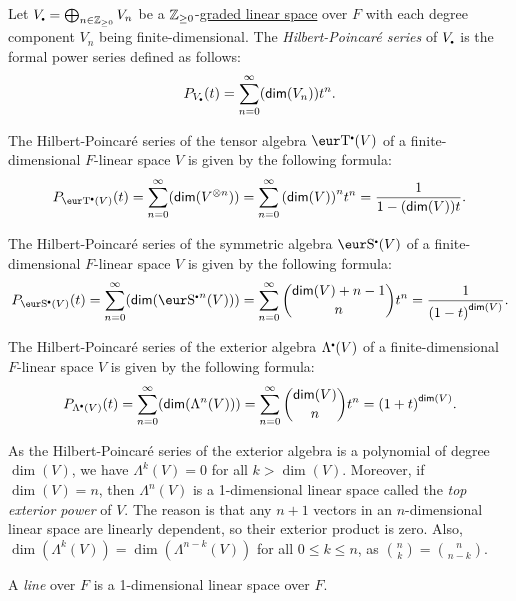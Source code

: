 \begin{definition}\label{def:hilbert_poincare_series}
	Let $V_{\smallbullet} = \bigoplus_{n \in \Z_{\geq 0}} V_n$ be a $\operatorname{\mathbb{Z}}_{\geq 0}$-\hyperref[def:graded_linear_space]{graded linear space} over $F$ with each degree component $V_n$ being finite-dimensional. The \emph{Hilbert-Poincaré series} of $V_{\smallbullet}$ is the formal power series defined as follows:
	\[
		P_{V_{\smallbullet}}(t) = \sum_{n = 0}^{\infty} (\dim(V_n)) t^n.
	\]
\end{definition}

\begin{example}
	The Hilbert-Poincaré series of the tensor algebra $\T(V)$ of a finite-dimensional $F$-linear space $V$ is given by the following formula:
	\[
		P_{\T(V)}(t) = \sum_{n = 0}^{\infty} (\dim(V^{\otimes n})) = \sum_{n = 0}^{\infty} {(\dim(V))}^n t^n = \frac{1}{1 - (\dim(V)) t}.
	\]
\end{example}

\begin{example}
	The Hilbert-Poincaré series of the symmetric algebra $\Sym(V)$ of a finite-dimensional $F$-linear space $V$ is given by the following formula:
	\[
		P_{\Sym(V)}(t) = \sum_{n = 0}^{\infty} (\dim(\Sym^n(V))) = \sum_{n = 0}^{\infty} \binom{\dim(V) + n - 1}{n} t^n = \frac{1}{{(1 - t)}^{\dim(V)}}.
	\]
\end{example}

\begin{example}
	The Hilbert-Poincaré series of the exterior algebra $\Ext(V)$ of a finite-dimensional $F$-linear space $V$ is given by the following formula:
	\[
		P_{\Ext(V)}(t) = \sum_{n = 0}^{\infty} (\dim(\Lambda^n(V))) = \sum_{n = 0}^{\infty} \binom{\dim(V)}{n} t^n = {(1 + t)}^{\dim(V)}.
	\]
\end{example}

As the Hilbert-Poincaré series of the exterior algebra is a polynomial of degree $\dim(V)$, we have $\Lambda^k(V) = 0$ for all $k > \dim(V)$. Moreover, if $\dim(V) = n$, then $\Lambda^n(V)$ is a 1-dimensional linear space called the \emph{top exterior power} of $V$. The reason is that any $n + 1$ vectors in an $n$-dimensional linear space are linearly dependent, so their exterior product is zero. Also, $\dim(\Lambda^k(V)) = \dim(\Lambda^{n - k}(V))$ for all $0 \leq k \leq n$, as $\binom{n}{k} = \binom{n}{n - k}$.

\begin{definition}[Line]\label{def:line}
	A \emph{line} over $F$ is a 1-dimensional linear space over $F$.
\end{definition}

